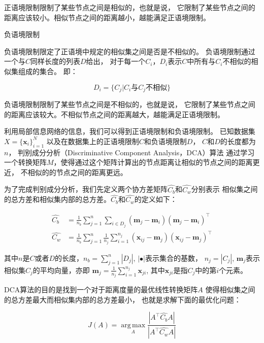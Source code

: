正语境限制限制了某些节点之间是相似的，也就是说，
它限制了某些节点之间的距离应该较小。相似节点之间的距离越小，越能满足正语境限制。

\begin{defn}{负语境限制}
\label{defn:negconstraints}

    负语境限制限定了正语境中规定的相似集之间是否是不相似的。
    负语境限制通过一个与$C$同样长度的列表$D$给出，
    对于每一个$C_i$，$D_i$表示$C$中所有与$C_i$不相似的相似集组成的集合。
    即：

    $$
    D_i = \{C_j | C_i \text{与} C_j \text{不相似} \}
    $$

\end{defn}

负语境限制限制了某些节点之间是不相似的，也就是说，
它限制了某些节点之间的距离应该较大。不相似节点之间的距离越大，越能满足正语境限制。

利用局部信息网络的信息，我们可以得到正语境限制和负语境限制。
已知数据集
$X = \{ \bm{x}_i \}_{i=1}^{N}$
以及在数据集上的正语境限制$C$和负语境限制$D$，
$C$和$D$的长度都为$n$，
判别成分分析（Discriminative Component Analysis，DCA）算法
通过学习一个转换矩阵$M$，使得通过这个矩阵计算出的节点距离让相似的节点之间的距离更近，
不相似的的节点之间的距离更远。

为了完成判别成分分析，我们先定义两个协方差矩阵$\hat{C_b}$和$\hat{C_w}$分别表示
相似集之间的总方差和相似集内部的总方差。$\hat{C_b}$和$\hat{C_w}$的定义如下：

\begin{align}
    \label{equa:cb}
    \hat{C_b} &= \frac{1}{n_b} \sum_{j=1}^n \sum_{i \in D_j} (\bm{m}_j - \bm{m}_i)(\bm{m}_j - \bm{m}_i)^\top \\
    \label{equa:cw}
    \hat{C_w} &= \frac{1}{n_b} \sum_{j=1}^n \frac{1}{n_j} \sum_{i = 1}^{n_j} (\bm{x}_{ij} - \bm{m}_j)(\bm{x}_{ij} - \bm{m}_j)^\top
\end{align}

其中$n$是$C$或者$D$的长度，$n_b = \sum_{j=1}^{n}|D_j|$, $|\bullet|$表示集合的基数，
$n_j = |C_j|$,
$\bm{m}_j$表示相似集$C_j$的平均向量，亦即
$\bm{m}_j = \frac{1}{n_j} \sum_{i=1}^{n_j} \bm{x}_{ji}$, 
其中$\bm{x}_{ji}$是指$C_j$中的第$i$个元素。

DCA算法的目的是找到一个对于距离度量的最优线性转换矩阵$A$
使得相似集之间的总方差最大而相似集内部的总方差最小，
也就是求解下面的最优化问题：

\begin{equation}
    \label{equa:dca_opt}
    J(A) = \operatorname*{arg\,max}_A \frac {|A^\top \hat{C_b} A|} {|A^\top \hat{C_w} A|}
\end{equation}

